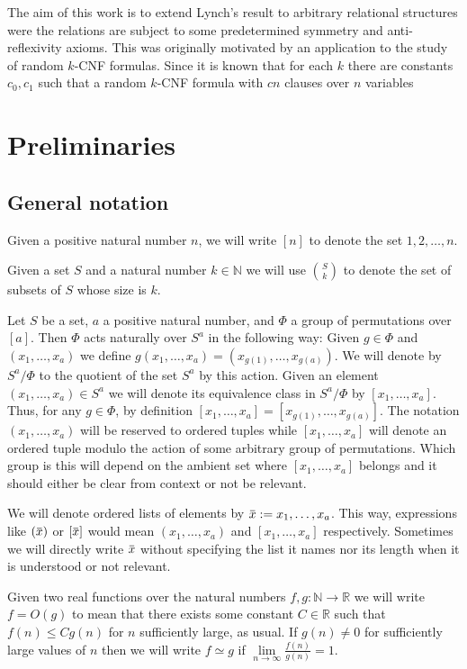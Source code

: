 \documentclass[12pt,notitlepage,a4paper]{article}
\theoremstyle{definition}
\newcommand{\R}{\mathbb{R}}
\newcommand{\N}{\mathbb{N}}
\newcommand{\Ln}{\lim\limits_{n\to \infty}}
\newcommand{\overbar}[1]{\mkern 1.5mu\overline{\mkern-1.5mu#1\mkern-1.5mu}\mkern 1.5mu}
\begin{document}
The aim of this work is to extend Lynch's result to arbitrary 
relational structures were the relations are subject to some
predetermined symmetry and anti-reflexivity axioms. This was 
originally motivated by an application to the study of random
$k$-CNF formulas. Since \cite{chvatal1992mick} it is known that 
for each $k$ there are constants $c_0,c_1$ such that a random 
$k$-CNF formula with $cn$ clauses over $n$ variables 

% 





\setcounter{section}{0}

\section{Preliminaries}

\subsection{General notation}

Given a positive natural number $n$, we will write
$[n]$ to denote the set ${1,2,\dots,n}$.\par
Given a set $S$ and a natural number $k\in \N$
we will use $\binom{S}{k}$ to denote the set of 
subsets of $S$ whose size is $k$. \par
Let $S$ be a set, $a$ a positive natural number, 
and $\Phi$ a group of permutations over 
$[a]$. Then $\Phi$ acts naturally over
$S^a$ in the following way: Given $g\in \Phi$ and
$(x_1,\dots,x_a)$ we define $g(x_1,\dots,x_a)=
(x_{g(1)},\dots,x_{g(a)})$.
We will denote by $S^a/\Phi$ to the quotient
of the set $S^a$ by this action. Given an element
$(x_1,\dots, x_a)\in S^a$ we will denote its equivalence
class in $S^a/\Phi$ by $[x_1,\dots,x_a]$. Thus, for any
$g\in \Phi$, by definition $[x_1,\dots,x_a]=[x_{g(1)}
,\dots,x_{g(a)}]$. The notation $(x_1,\dots, x_a)$ 
will be reserved 
to ordered tuples while 
$[x_1,\dots,x_a]$ will denote an ordered tuple modulo the
action of some arbitrary group of permutations. Which group is
this will depend on the ambient set where $[x_1,\dots,x_a]$ belongs
and it should either be clear from context or not be relevant.\par
We will denote ordered lists of elements by $\overbar{x}:=x_1,\dots,x_a$. 
This way, expressions like $(\overbar{x})$ or $[\overbar{x}]$ would mean 
$(x_1,\dots,x_a)$ and $[x_1,\dots,x_a]$ respectively.
Sometimes we will directly write $\overbar{x}$ without specifying the list
it names nor its length when it is understood or not relevant.
\par
Given two real functions over the natural numbers 
$f,g:\N \rightarrow \R$ we will write $f=O(g)$ to 
mean that there exists some constant $C\in \R$
such that $f(n)\leq Cg(n)$ for $n$ sufficiently large, 
as usual.
If $g(n)\neq 0$ for sufficiently large values of $n$ then
we will write $f\simeq g$ if $\Ln \frac{f(n)}{g(n)}=1$.\par
\end{document}
